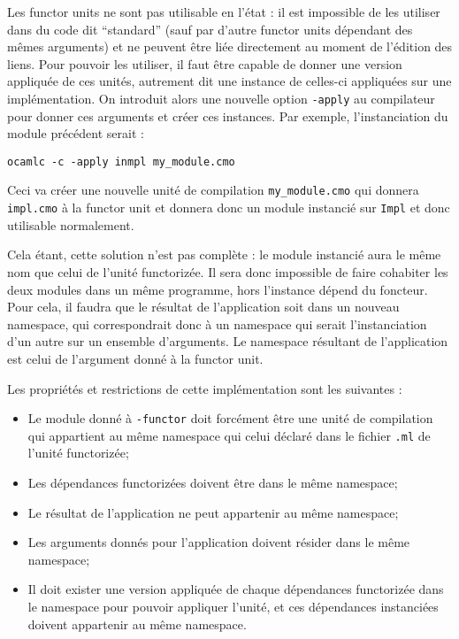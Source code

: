 \documentclass[11pt,a4paper]{report}
\begin{document}
Les functor units ne sont pas utilisable en l'état : il est impossible de les
utiliser dans du code dit ``standard'' (sauf par d'autre functor units dépendant
des mêmes arguments) et ne peuvent être liée directement au
moment de l'édition des liens. Pour pouvoir les utiliser, il faut être capable
de donner une version appliquée de ces unités, autrement dit une instance de
celles-ci appliquées sur une implémentation. On introduit alors une nouvelle
option \texttt{-apply} au compilateur pour donner ces arguments et créer ces
instances. Par exemple, l'instanciation du module précédent serait :
\begin{verbatim}
ocamlc -c -apply inmpl my_module.cmo
\end{verbatim}
Ceci va créer une nouvelle unité de compilation \texttt{my\_module.cmo} qui
donnera \texttt{impl.cmo} à la functor unit et donnera donc un module instancié
sur \texttt{Impl} et donc utilisable normalement. 

Cela étant, cette solution n'est pas complète : le module instancié aura le même
nom que celui de l'unité functorizée. Il sera donc impossible de faire cohabiter
les deux modules dans un même programme, hors l'instance dépend du
foncteur. Pour cela, il faudra que le résultat de l'application soit dans un
nouveau namespace, qui correspondrait donc à un namespace qui serait
l'instanciation d'un autre sur un ensemble d'arguments. Le namespace résultant
de l'application est celui de l'argument donné à la functor unit.

Les propriétés et restrictions de cette implémentation sont les suivantes :
\begin{itemize}
\item Le module donné à \texttt{-functor} doit forcément être une unité de
  compilation qui appartient au même namespace qui celui déclaré dans le fichier
  \texttt{.ml} de l'unité functorizée;
\item Les dépendances functorizées doivent être dans le même namespace;
\item Le résultat de l'application ne peut appartenir au même namespace;
\item Les arguments donnés pour l'application doivent résider dans le même
  namespace;
\item Il doit exister une version appliquée de chaque dépendances functorizée
  dans le namespace pour pouvoir appliquer l'unité, et ces dépendances
  instanciées doivent appartenir au même namespace.
\end{itemize}
\end{document}
